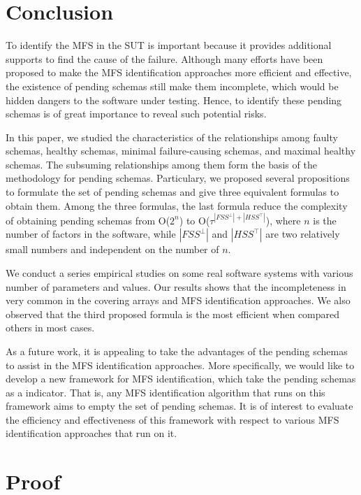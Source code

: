 {\section{Conclusion}\label{sec:conclusion}
To identify the MFS in the SUT is important because it provides additional supports to find the cause of the failure. Although many efforts have been proposed to make the MFS identification approaches more efficient and effective, the existence of pending schemas still make them incomplete, which would be hidden dangers to the software under testing. Hence, to identify these pending schemas is of great importance to reveal such potential risks.

In this paper, we studied the characteristics of the relationships among faulty schemas, healthy schemas, minimal failure-causing schemas, and maximal healthy schemas. The subsuming relationships among them form the basis of the methodology for pending schemas. Particulary, we proposed several propositions to formulate the set of pending schemas and give three equivalent formulas to obtain them. Among the three formulas, the last formula reduce the complexity of obtaining pending schemas from O($2^{n}$) to O($ \tau^{|FSS^{\bot}|+|HSS^{\top}|}$), where $n$ is the number of factors in the software, while $|FSS^{\bot}|$ and $|HSS^{\top}|$ are two relatively small numbers and independent on the number of $n$.

We conduct a series empirical studies on some real software systems with various number of parameters and values. Our results shows that the incompleteness in very common in the covering arrays and MFS identification approaches. We also observed that the third proposed formula is the most efficient when compared others in most cases.

As a future work, it is appealing to take the advantages of the pending schemas to assist in the MFS identification approaches. More specifically, we would like to develop a new framework for MFS identification, which take the pending schemas as a indicator. That is, any MFS identification algorithm that runs on this framework aims to empty the set of pending schemas. It is of interest to evaluate the efficiency and effectiveness of this framework with respect to various MFS identification approaches that run on it.

\appendix
\section{Proof}

}
